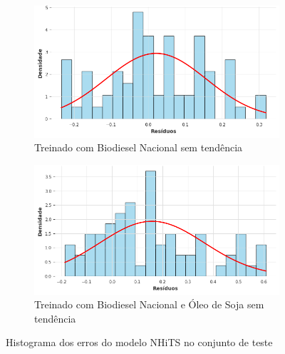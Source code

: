 \begin{figure}[htbp]
	\begin{subfigure}[b]{0.40\textwidth}
		\centering
		\includegraphics[width=\textwidth]{figuras/nhits_brasil_detrend_residuals_histogram.png} %
		\caption{Treinado com Biodiesel Nacional sem tendência}
		\label{fig:nhits_brasil_detrend_residuals_histogram}
	\end{subfigure}
	\hfill
	\begin{subfigure}[b]{0.40\textwidth}
		\centering
		\includegraphics[width=\textwidth]{figuras/nhits_brasil_oil_detrend_residuals_histogram.png} %
		\caption{Treinado com Biodiesel Nacional e Óleo de Soja sem tendência}
		\label{fig:nhits_brasil_oil_detrend_residuals_histogram}
	\end{subfigure}

	\caption{Histograma dos erros do modelo \acs{NHiTS} no conjunto de teste}
	\label{fig:nhits_residuals_histogram}
\end{figure}


